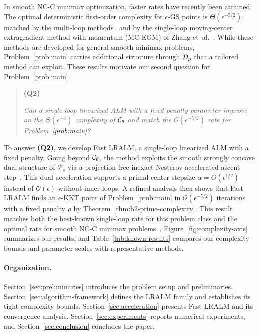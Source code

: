 In smooth NC-C minimax optimization, faster rates have recently
been attained. The optimal deterministic first-order complexity
for \(\epsilon\)-GS points is \(\Theta(\epsilon^{-5/2})\), matched by the
multi-loop methods~\cite{lin2020near,ostrovskii2021efficient,pan2026optimal} and by the
single-loop moving-center extragradient method with momentum (MC-EGM) of
Zhang et~al.~\cite{zhang2026matching}. While these methods are developed
for general smooth minimax problems, Problem~\eqref{prob:main} carries
additional structure through \(\mathcal{D}_\rho\) that a tailored method can exploit.
These results motivate our second question for Problem~\eqref{prob:main}.
\begin{quote}
  \hypertarget{Q2}{\textbf{(Q2)}}
  \emph{Can a single-loop linearized ALM with a fixed penalty parameter improve on
  the \(\Theta(\epsilon^{-3})\) complexity of \(\mathcal{C}_\theta\) and match the
  \(\mathcal O(\epsilon^{-5/2})\) rate for Problem~\eqref{prob:main}?}
\end{quote}

To answer \hyperlink{Q2}{\textbf{(Q2)}}, we develop Fast LRALM, a single-loop
linearized ALM with a fixed penalty. Going beyond \(\mathcal{C}_\theta\), the method
exploits the smooth strongly concave dual structure of \(\mathcal P_s\) via a
projection-free inexact Nesterov accelerated ascent
step~\cite{nesterov1983method}. This dual acceleration supports a primal
center stepsize \(\alpha=\Theta(\epsilon^{1/2})\) instead of \(\mathcal O(\epsilon)\)
without inner loops. A refined analysis
then shows that Fast LRALM finds an \(\epsilon\)-KKT point of Problem~\eqref{prob:main} in
\(\mathcal O(\epsilon^{-5/2})\) iterations with a fixed penalty \(\rho\)
by Theorem~\ref{thm:b2-prime-complexity}. This result matches both the
best-known single-loop rate for this problem class and the optimal rate for
smooth NC-C minimax problems~\cite{pan2026optimal}.
Figure~\ref{fig:complexity-axis} summarizes our results, and
Table~\ref{tab:known-results} compares our complexity bounds and parameter
scales with representative methods.

\paragraph{Organization.}
Section~\ref{sec:preliminaries} introduces the problem setup and preliminaries.
Section~\ref{sec:algorithm-framework} defines the LRALM family and establishes
its tight complexity bounds. Section~\ref{sec:acceleration} presents Fast LRALM
and its convergence analysis.
Section~\ref{sec:experiments} reports numerical experiments, and
Section~\ref{sec:conclusion} concludes the paper.  

